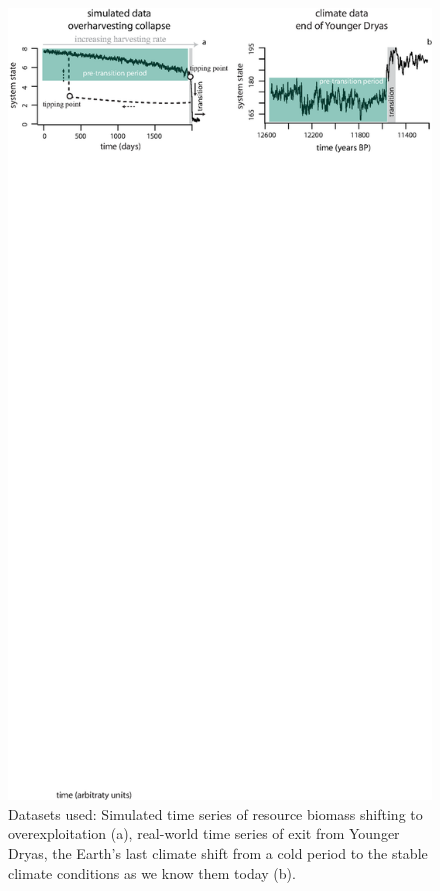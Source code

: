 \documentclass[12pt,a4paper,final]{article}
\begin{document}
\begin{doublespacing}
\begin{figure}[ht]
\begin{center}
\includegraphics[scale=0.75]{figure_data.eps}
\caption{Datasets used: Simulated time series of resource biomass shifting to overexploitation (a), real-world time series of exit from Younger Dryas, the Earth's last climate shift from a cold period to the stable climate conditions as we know them today (b).}
\end{center}
\end{figure}


\end{doublespacing}
\end{document}
